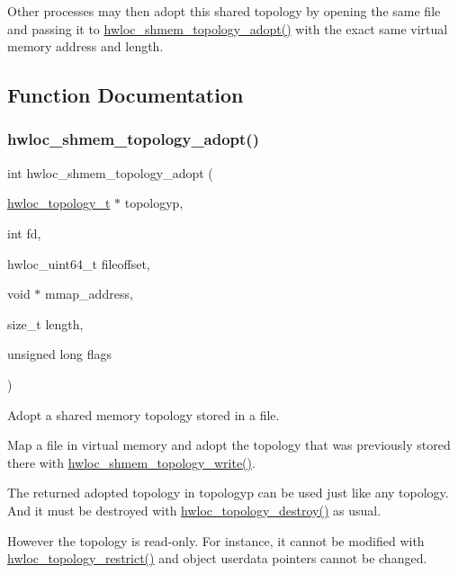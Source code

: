 Other processes may then adopt this shared topology by opening the same file and passing it to \hyperlink{a00226_ga21545bd0f09d9b554c8e60a630e0e629}{hwloc\+\_\+shmem\+\_\+topology\+\_\+adopt()} with the exact same virtual memory address and length. 

\subsection{Function Documentation}
\mbox{\label{a00226_ga21545bd0f09d9b554c8e60a630e0e629}} 
\subsubsection{\texorpdfstring{hwloc\+\_\+shmem\+\_\+topology\+\_\+adopt()}{hwloc\_shmem\_topology\_adopt()}}
{\footnotesize\ttfamily int hwloc\+\_\+shmem\+\_\+topology\+\_\+adopt (\begin{DoxyParamCaption}\item[{\hyperlink{a00186_ga9d1e76ee15a7dee158b786c30b6a6e38}{hwloc\+\_\+topology\+\_\+t} $\ast$}]{topologyp,  }\item[{int}]{fd,  }\item[{hwloc\+\_\+uint64\+\_\+t}]{fileoffset,  }\item[{void $\ast$}]{mmap\+\_\+address,  }\item[{size\+\_\+t}]{length,  }\item[{unsigned long}]{flags }\end{DoxyParamCaption})}



Adopt a shared memory topology stored in a file. 

Map a file in virtual memory and adopt the topology that was previously stored there with \hyperlink{a00226_ga61b20e346fc76f76420e3a88cc80a671}{hwloc\+\_\+shmem\+\_\+topology\+\_\+write()}.

The returned adopted topology in {\ttfamily topologyp} can be used just like any topology. And it must be destroyed with \hyperlink{a00186_ga9f34a640b6fd28d23699d4d084667b15}{hwloc\+\_\+topology\+\_\+destroy()} as usual.

However the topology is read-\/only. For instance, it cannot be modified with \hyperlink{a00194_ga6db81ed13ac0a9d70cc80372ab537815}{hwloc\+\_\+topology\+\_\+restrict()} and object userdata pointers cannot be changed.

